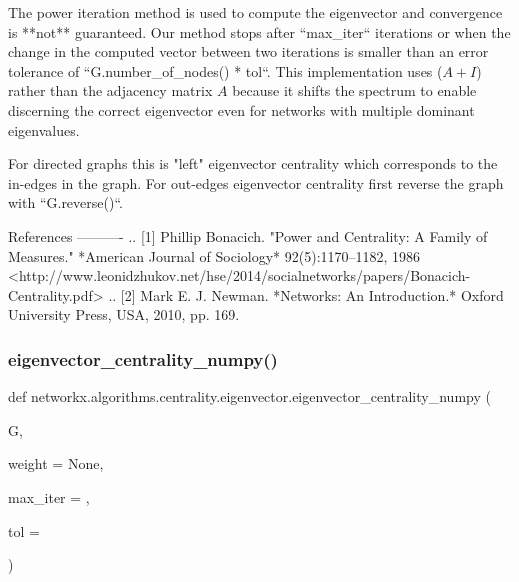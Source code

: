 \begin{DoxyVerb}
The power iteration method is used to compute the eigenvector and
convergence is **not** guaranteed. Our method stops after ``max_iter``
iterations or when the change in the computed vector between two
iterations is smaller than an error tolerance of
``G.number_of_nodes() * tol``. This implementation uses ($A + I$)
rather than the adjacency matrix $A$ because it shifts the spectrum
to enable discerning the correct eigenvector even for networks with
multiple dominant eigenvalues.

For directed graphs this is "left" eigenvector centrality which corresponds
to the in-edges in the graph. For out-edges eigenvector centrality
first reverse the graph with ``G.reverse()``.

References
----------
.. [1] Phillip Bonacich.
   "Power and Centrality: A Family of Measures."
   *American Journal of Sociology* 92(5):1170–1182, 1986
   <http://www.leonidzhukov.net/hse/2014/socialnetworks/papers/Bonacich-Centrality.pdf>
.. [2] Mark E. J. Newman.
   *Networks: An Introduction.*
   Oxford University Press, USA, 2010, pp. 169.\end{DoxyVerb}
 \mbox{\label{namespacenetworkx_1_1algorithms_1_1centrality_1_1eigenvector_a0b606aaa87fdae028b1a626b6348aa72}} 
\subsubsection{\texorpdfstring{eigenvector\+\_\+centrality\+\_\+numpy()}{eigenvector\_centrality\_numpy()}}
{\footnotesize\ttfamily def networkx.\+algorithms.\+centrality.\+eigenvector.\+eigenvector\+\_\+centrality\+\_\+numpy (\begin{DoxyParamCaption}\item[{}]{G,  }\item[{}]{weight = {\ttfamily None},  }\item[{}]{max\+\_\+iter = {},  }\item[{}]{tol = {} }\end{DoxyParamCaption})}

